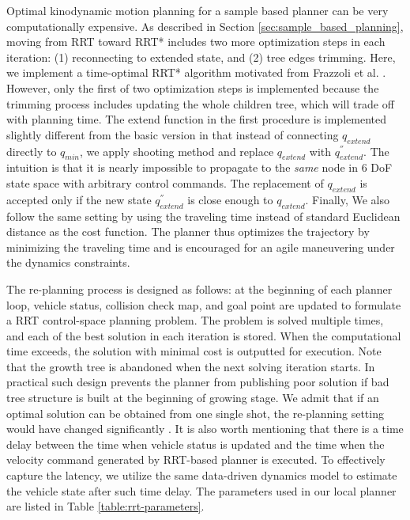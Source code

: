\documentclass[../thesis.tex]{subfiles}
\begin{document}
Optimal kinodynamic motion planning for a sample based planner can be very computationally expensive.
As described in Section \ref{sec:sample_based_planning}, moving from RRT toward RRT* includes two more optimization steps in each iteration: (1) reconnecting to extended state, and (2) tree edges trimming.
Here, we implement a time-optimal RRT* algorithm motivated from Frazzoli et al. \cite{hwan2011anytime}.
However, only the first of two optimization steps is implemented because the trimming process includes updating the whole children tree, which will trade off with planning time.
The extend function in the first procedure is implemented slightly different from the basic version in that instead of connecting $q_{extend}$ directly to $q_{min}$, we apply shooting method and replace $q_{extend}$ with $q^{''}_{extend}$.
The intuition is that it is nearly impossible to propagate to the \textit{same} node in 6 DoF state space with arbitrary control commands.
The replacement of $q_{extend}$ is accepted only if the new state $q^{''}_{extend}$ is close enough to $q_{extend}$.
Finally, We also follow the same setting by using the traveling time instead of standard Euclidean distance as the cost function.
The planner thus optimizes the trajectory by minimizing the traveling time and is encouraged for an agile maneuvering under the dynamics constraints.
 
The re-planning process is designed as follows: at the beginning of each planner loop, vehicle status, collision check map, and goal point are updated to formulate a RRT control-space planning problem.
The problem is solved multiple times, and each of the best solution in each iteration is stored.
When the computational time exceeds, the solution with minimal cost is outputted for execution.
Note that the growth tree is abandoned when the next solving iteration starts.
In practical such design prevents the planner from publishing poor solution if bad tree structure is built at the beginning of growing stage.
We admit that if an optimal solution can be obtained from one single shot, the re-planning setting would have changed significantly \cite{ferguson2006replanning}.
It is also worth mentioning that there is a time delay between the time when vehicle status is updated and the time when the velocity command generated by RRT-based planner is executed.
To effectively capture the latency, we utilize the same data-driven dynamics model to estimate the vehicle state after such time delay.
The parameters used in our local planner are listed in Table \ref{table:rrt-parameters}.
 
\end{document}
